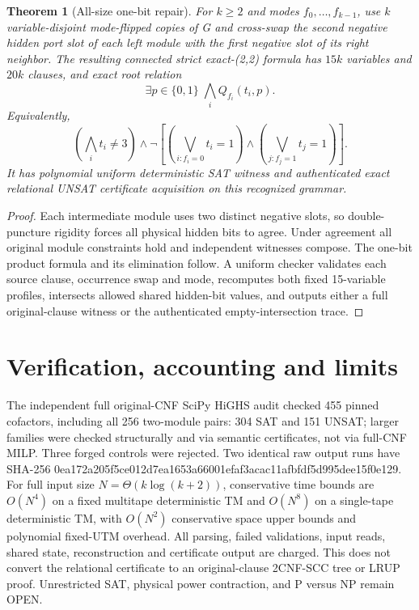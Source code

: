 \documentclass[11pt]{article}
\newtheorem{theorem}{Theorem}
\begin{document}
\begin{theorem}[All-size one-bit repair]
For $k\ge2$ and modes $f_0,\ldots,f_{k-1}$, use $k$ variable-disjoint mode-flipped copies of G and cross-swap the second negative hidden port slot of each left module with the first negative slot of its right neighbor. The resulting connected strict exact-(2,2) formula has $15k$ variables and $20k$ clauses, and exact root relation
\[
\exists p\in\{0,1\}\;\bigwedge_i Q_{f_i}(t_i,p).
\]
Equivalently,
\[
\left(\bigwedge_i t_i\ne3\right)\land
\neg\left[(\bigvee_{i:f_i=0}t_i=1)\land(\bigvee_{j:f_j=1}t_j=1)\right].
\]
It has polynomial uniform deterministic SAT witness and authenticated exact relational UNSAT certificate acquisition on this recognized grammar.
\end{theorem}
\begin{proof}
Each intermediate module uses two distinct negative slots, so double-puncture rigidity forces all physical hidden bits to agree. Under agreement all original module constraints hold and independent witnesses compose. The one-bit product formula and its elimination follow. A uniform checker validates each source clause, occurrence swap and mode, recomputes both fixed 15-variable profiles, intersects allowed shared hidden-bit values, and outputs either a full original-clause witness or the authenticated empty-intersection trace.
\end{proof}
\section{Verification, accounting and limits}
The independent full original-CNF SciPy HiGHS audit checked 455 pinned cofactors, including all 256 two-module pairs: 304 SAT and 151 UNSAT; larger families were checked structurally and via semantic certificates, not via full-CNF MILP. Three forged controls were rejected. Two identical raw output runs have SHA-256 0ea172a205f5ce012d7ea1653a66001efaf3acac11afbfdf5d995dee15f0e129. For full input size $N=\Theta(k\log(k+2))$, conservative time bounds are $O(N^4)$ on a fixed multitape deterministic TM and $O(N^8)$ on a single-tape deterministic TM, with $O(N^2)$ conservative space upper bounds and polynomial fixed-UTM overhead. All parsing, failed validations, input reads, shared state, reconstruction and certificate output are charged. This does not convert the relational certificate to an original-clause 2CNF-SCC tree or LRUP proof. Unrestricted SAT, physical power contraction, and P versus NP remain OPEN.
\end{document}
